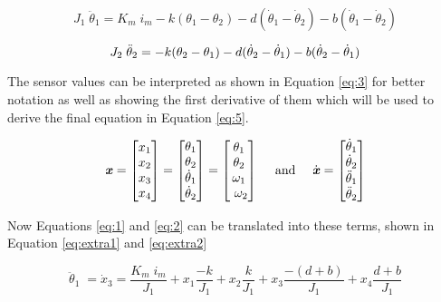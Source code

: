\begin{equation}
J_1 \; \ddot{\theta}_1 = K_m \; i_m - k(\theta_1-\theta_2) - d(\dot{\theta}_1-\dot{\theta}_2) - b(\dot{\theta}_1-\dot{\theta}_2)
\label{eq:1}
\end{equation}

\begin{equation}
J_2 \; \ddot{\theta}_2 = -k(\theta_2-\theta_1) - d(\dot{\theta}_2-\dot{\theta}_1) - b(\dot{\theta}_2-\dot{\theta}_1)
\label{eq:2}
\vspace{.2em}
\end{equation}

The sensor values can be interpreted as shown in Equation \ref{eq:3} for better notation as well as showing the first derivative of them which will be used to derive the final equation in Equation \ref{eq:5}.

\begin{equation}
\label{eq:3}
\text{\textit{\textbf{x}}} =
\begin{bmatrix}
x_1 \\
x_2  \\
x_3  \\
x_4  
\end{bmatrix}
=
\begin{bmatrix}
\theta_1\\
 \theta_2\\
\dot{\theta}_1\\
\dot{\theta}_2
\end{bmatrix}
=
\begin{bmatrix}
\theta_1\\
\theta_2\\
\omega_1\\
\ \omega_2
\end{bmatrix}
\quad\text{ and }\quad
\dot{\text{\textit{\textbf{x}}}} =
\begin{bmatrix}
\dot{\theta}_1\\
\dot{\theta}_2\\
\ddot{\theta}_1\\
\ddot{\theta}_2
\end{bmatrix}
\vspace{.2em}
\end{equation}

Now Equations \ref{eq:1} and \ref{eq:2} can be translated into these terms, shown in Equation \ref{eq:extra1} and \ref{eq:extra2}

\begin{equation}
 \ddot{\theta}_1 \; = \dot{x}_3 = \dfrac{K_m \; i_m}{J_1} + x_1 \frac{-k}{J_1} +  x_2 \frac{k}{J_1} + x_3 \frac{-(d+b)}{J_1} + x_4 \frac{d+b}{J_1}
\label{eq:extra1}
\end{equation}

